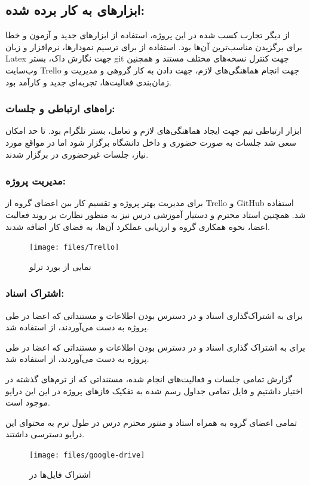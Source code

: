 \documentclass[12pt]{article}
\begin{document}
	\subsection{ابزارهای به کار برده شده:‫‬‬}
از دیگر تجارب کسب شده در این پروژه، استفاده از ابزارهای جدید و آزمون و خطا برای برگزیدن مناسب‌ترین آن‌ها بود. استفاده از
 برای ترسیم نمودارها، نرم‌افزار و زبان Latex جهت نگارش داک، بستر git جهت کنترل نسخه‌های مختلف مستند و همچنین وب‌سایت Trello جهت انجام هماهنگی‌های لازم، جهت دادن به کار گروهی و مدیریت و زمان‌بندی فعالیت‌ها، تجربه‌ای جدید و کارآمد بود.
	\subsubsection{راه‌های ارتباطی و جلسات:‫‬‬}
	ابزار ارتباطی تیم جهت ایجاد هماهنگی‌های لازم و تعامل، بستر تلگرام بود.
	تا حد امکان سعی شد جلسات به صورت حضوری و داخل دانشگاه برگزار شود اما در مواقع مورد نیاز، جلسات غیرحضوری در
	 برگزار شدند.

	\subsubsection{مدیریت پروژه:‫‬‬}
برای مدیریت بهتر پروژه و تقسیم کار بین اعضای گروه از Trello و GitHub استفاده شد. همچنین استاد محترم و دستیار آموزشی درس نیز به منظور نظارت بر روند فعالیت اعضا، نحوه همکاری گروه و ارزیابی عملکرد آن‌ها، به فضای کار اضافه شدند.
	\begin{figure}[H]
	\centering
	\texttt{[image: files/Trello]}
	\caption{نمایی از بورد ترلو}
	\label{fig:trello}
	\end{figure}
	\subsubsection{اشتراک اسناد:‫‬‬}
برای به اشتراک‌گذاری اسناد و در دسترس بودن اطلاعات و مستنداتی که اعضا در طی پروژه به دست می‌آوردند، از
 استفاده شد.

 برای به اشتراک گذاری اسناد و در دسترس بودن اطلاعات و مستنداتی که اعضا در طی پروژه به دست می‌آوردند، از
  استفاده شد.

 گزارش تمامی جلسات و فعالیت‌های انجام شده، مستنداتی که از ترم‌های گذشته در اختیار داشتیم و فایل تمامی جداول رسم شده به تفکیک فازهای پروژه در این این درایو موجود است.

 تمامی اعضای گروه به همراه استاد و منتور محترم درس در طول ترم به محتوای این درایو دسترسی داشتند.
	\begin{figure}[H]
		\centering
		\texttt{[image: files/google-drive]}
		\caption{اشتراک فایل‌ها در }
		\label{fig:google-drive}
	\end{figure}
\end{document}
